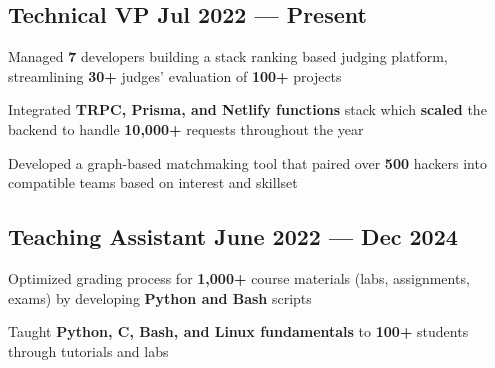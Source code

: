 \subsection{{Technical VP \hfill Jul 2022 --- Present}}
\begin{zitemize}
    \item Managed \textbf{7} developers building a stack ranking based judging platform, streamlining \textbf{30+} judges' evaluation of \textbf{100+} projects
    \item Integrated \textbf{TRPC, Prisma, and Netlify functions} stack which \textbf{scaled} the backend to handle \textbf{10,000+} requests throughout the year
    \item Developed a graph-based matchmaking tool that paired over \textbf{500} hackers into compatible teams based on interest and skillset
\end{zitemize}


\subsection{{Teaching Assistant \hfill June 2022 --- Dec 2024}}
\begin{zitemize}
    \item Optimized grading process for \textbf{1,000+} course materials (labs, assignments, exams) by developing \textbf{Python and Bash} scripts
    \item Taught \textbf{Python, C, Bash, and Linux fundamentals} to \textbf{100+} students through tutorials and labs
\end{zitemize}




